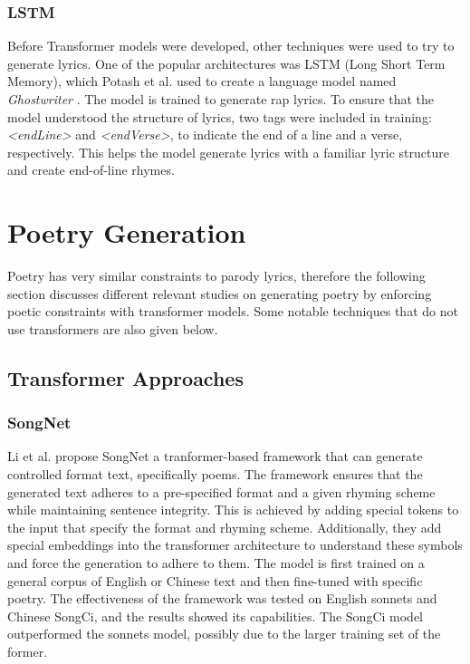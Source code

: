 \subsubsection{LSTM}
Before Transformer models were developed, other techniques were used to try to generate lyrics. One of the popular architectures was LSTM (Long Short Term Memory), which Potash et al. used to create a language model named \textit{Ghostwriter} \cite{potash_ghostwriter_2015}. The model is trained to generate rap lyrics. To ensure that the model understood the structure of lyrics, two tags were included in training: \textit{<endLine>} and \textit{<endVerse>}, to indicate the end of a line and a verse, respectively. This helps the model generate lyrics with a familiar lyric structure and create end-of-line rhymes. 


\section{Poetry Generation}
Poetry has very similar constraints to parody lyrics, therefore the following section discusses different relevant studies on generating poetry by enforcing poetic constraints with transformer models. Some notable techniques that do not use transformers are also given below. 

\subsection{Transformer Approaches}

\subsubsection{SongNet}
Li et al. propose SongNet \cite{li_rigid_2020} a tranformer-based framework that can generate controlled format text, specifically poems. The framework ensures that the generated text adheres to a pre-specified format and a given rhyming scheme while maintaining sentence integrity. This is achieved by adding special tokens to the input that specify the format and rhyming scheme. Additionally, they add special embeddings into the transformer architecture to understand these symbols and force the generation to adhere to them. The model is first trained on a general corpus of English or Chinese text and then fine-tuned with specific poetry. The effectiveness of the framework was tested on English sonnets and Chinese SongCi, and the results showed its capabilities. The SongCi model outperformed the sonnets model, possibly due to the larger training set of the former. 



